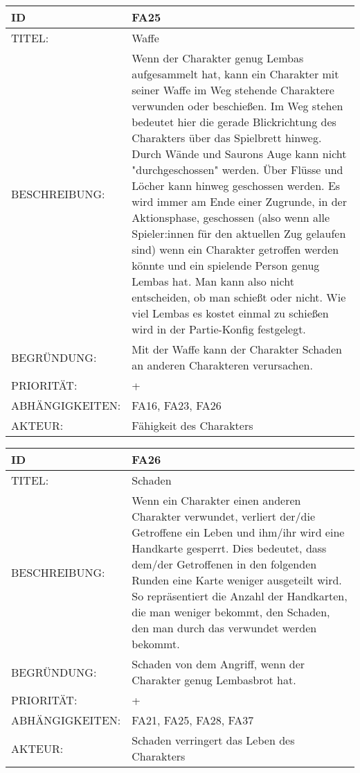 \documentclass{uulm-assignment}
\begin{document}
    \begin{tabularx}{\textwidth}{|l|X |} \hline
        \textbf{ID} & \textbf{FA25} \\
        \hline
        TITEL: &  Waffe\\
        \hline
        BESCHREIBUNG: & Wenn der Charakter genug Lembas aufgesammelt hat, kann ein Charakter mit seiner Waffe im
Weg stehende Charaktere verwunden oder beschießen. Im Weg stehen bedeutet hier die gerade
Blickrichtung des Charakters über das Spielbrett hinweg. Durch Wände und Saurons Auge kann
nicht "durchgeschossen" werden. Über Flüsse und Löcher kann hinweg geschossen werden.\newline
Es wird immer am Ende einer Zugrunde, in der Aktionsphase, geschossen (also wenn alle Spieler:innen
für den aktuellen Zug gelaufen sind) wenn ein Charakter getroffen werden könnte und ein spielende
Person genug Lembas hat. Man kann also nicht entscheiden, ob man schießt oder nicht. Wie viel
Lembas es kostet einmal zu schießen wird in der Partie-Konfig festgelegt.
        \\
        \hline
        BEGRÜNDUNG: & Mit der Waffe kann der Charakter Schaden an anderen Charakteren verursachen. \\
        \hline
        PRIORITÄT: & +\\
        \hline
        ABHÄNGIGKEITEN: & FA16, FA23, FA26\\
        \hline
        AKTEUR: & Fähigkeit des Charakters\\
        \hline
    \end{tabularx}
    
    \begin{tabularx}{\textwidth}{|l|X |} \hline
        \textbf{ID} & \textbf{FA26} \\
        \hline
        TITEL: & Schaden \\
        \hline
        BESCHREIBUNG: & Wenn ein Charakter einen anderen Charakter verwundet, verliert der/die Getroffene ein Leben und ihm/ihr
wird eine Handkarte gesperrt. Dies bedeutet, dass dem/der Getroffenen in den folgenden Runden
eine Karte weniger ausgeteilt wird. So repräsentiert die Anzahl der Handkarten, die man weniger
bekommt, den Schaden, den man durch das verwundet werden bekommt.
        \\
        \hline
        BEGRÜNDUNG: & Schaden von dem Angriff, wenn der Charakter genug Lembasbrot hat. \\
        \hline
        PRIORITÄT: & +\\
        \hline
        ABHÄNGIGKEITEN: & FA21, FA25, FA28, FA37 \\
        \hline
        AKTEUR: & Schaden verringert das Leben des Charakters\\
        \hline
    \end{tabularx}
    
\end{document}
